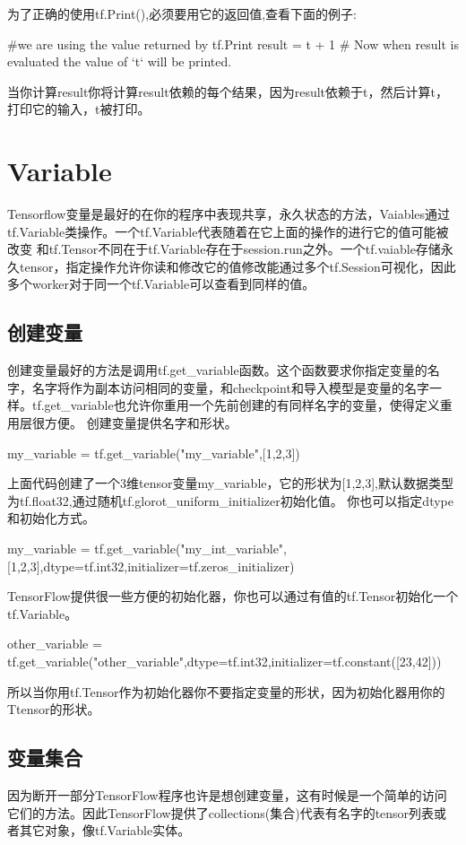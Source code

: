 为了正确的使用tf.Print(),必须要用它的返回值,查看下面的例子:
\begin{python}
	#we are using the value returned by tf.Print
result = t + 1  # Now when result is evaluated the value of `t` will be printed.
\end{python}
当你计算result你将计算result依赖的每个结果，因为result依赖于t，然后计算t，打印它的输入，t被打印。
\section{Variable}
Tensorflow变量是最好的在你的程序中表现共享，永久状态的方法，Vaiables通过tf.Variable类操作。一个tf.Variable代表随着在它上面的操作的进行它的值可能被改变
和tf.Tensor不同在于tf.Variable存在于session.run之外。一个tf.vaiable存储永久tensor，指定操作允许你读和修改它的值修改能通过多个tf.Session可视化，因此多个worker对于同一个tf.Variable可以查看到同样的值。
\subsection{创建变量}
创建变量最好的方法是调用tf.get\_variable函数。这个函数要求你指定变量的名字，名字将作为副本访问相同的变量，和checkpoint和导入模型是变量的名字一样。tf.get\_variable也允许你重用一个先前创建的有同样名字的变量，使得定义重用层很方便。
创建变量提供名字和形状。
\begin{python}
	my_variable = tf.get_variable("my_variable",[1,2,3])
\end{python}
上面代码创建了一个3维tensor变量my\_variable，它的形状为[1,2,3],默认数据类型为tf.float32,通过随机tf.glorot\_uniform\_initializer初始化值。
你也可以指定dtype和初始化方式。
\begin{python}
	my_variable = tf.get_variable("my_int_variable",[1,2,3],dtype=tf.int32,initializer=tf.zeros_initializer)
\end{python}
TensorFlow提供很一些方便的初始化器，你也可以通过有值的tf.Tensor初始化一个tf.Variable。
\begin{python}
	other_variable = tf.get_variable("other_variable",dtype=tf.int32,initializer=tf.constant([23,42]))
\end{python}
所以当你用tf.Tensor作为初始化器你不要指定变量的形状，因为初始化器用你的Ttensor的形状。
\subsection{变量集合}
因为断开一部分TensorFlow程序也许是想创建变量，这有时候是一个简单的访问它们的方法。因此TensorFlow提供了collections(集合)代表有名字的tensor列表或者其它对象，像tf.Variable实体。

